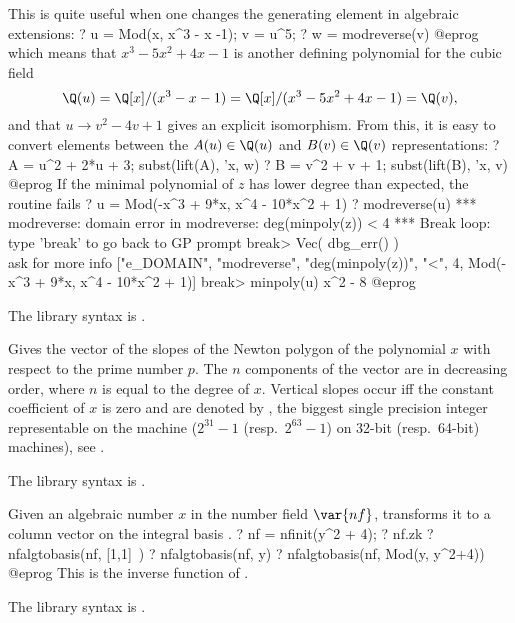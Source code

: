 This is quite useful when one changes the generating element in algebraic
extensions:
\bprog
? u = Mod(x, x^3 - x -1); v = u^5;
? w = modreverse(v)
@eprog\noindent
which means that $x^3 - 5x^2 + 4x -1$ is another defining polynomial for the
cubic field
$$\Q(u) = \Q[x]/(x^3 - x - 1) = \Q[x]/(x^3 - 5x^2 + 4x - 1) = \Q(v),$$
and that $u \to v^2 - 4v + 1$ gives an explicit isomorphism. From this, it is
easy to convert elements between the $A(u)\in \Q(u)$ and $B(v)\in \Q(v)$
representations:
\bprog
? A = u^2 + 2*u + 3; subst(lift(A), 'x, w)
? B = v^2 + v + 1;   subst(lift(B), 'x, v)
@eprog
If the minimal polynomial of $z$ has lower degree than expected, the routine
fails
\bprog
? u = Mod(-x^3 + 9*x, x^4 - 10*x^2 + 1)
? modreverse(u)
 *** modreverse: domain error in modreverse: deg(minpoly(z)) < 4
 ***   Break loop: type 'break' to go back to GP prompt
break> Vec( dbg_err() ) \\ ask for more info
["e_DOMAIN", "modreverse", "deg(minpoly(z))", "<", 4,
  Mod(-x^3 + 9*x, x^4 - 10*x^2 + 1)]
break> minpoly(u)
x^2 - 8
@eprog

The library syntax is .

\label{se:newtonpoly}
Gives the vector of the slopes of the Newton
polygon of the polynomial $x$ with respect to the prime number $p$. The $n$
components of the vector are in decreasing order, where $n$ is equal to the
degree of $x$. Vertical slopes occur iff the constant coefficient of $x$ is
zero and are denoted by , the biggest single precision
integer representable on the machine ($2^{31}-1$ (resp.~$2^{63}-1$) on 32-bit
(resp.~64-bit) machines), see .

The library syntax is .

\label{se:nfalgtobasis}
Given an algebraic number $x$ in the number field $\var{nf}$,
transforms it to a column vector on the integral basis .
\bprog
? nf = nfinit(y^2 + 4);
? nf.zk
? nfalgtobasis(nf, [1,1]~)
? nfalgtobasis(nf, y)
? nfalgtobasis(nf, Mod(y, y^2+4))
@eprog
This is the inverse function of .

The library syntax is .

